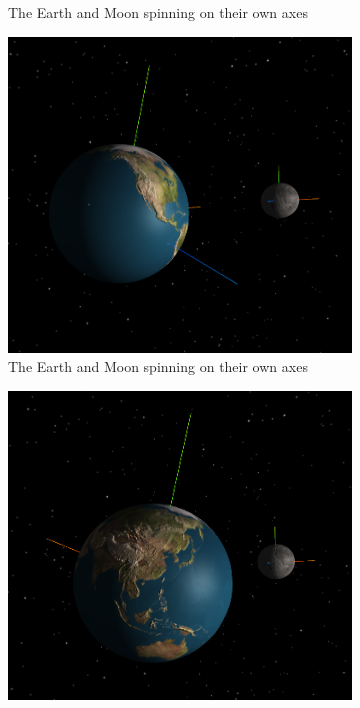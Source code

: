 \documentclass[12pt]{article}
\begin{document}
\begin{figure}[H]
\begin{subfigure}[b]{0.4\textwidth}
                \caption{The Earth and Moon spinning on their own axes}
                \label{fig: The axial spin of the Earth and moon.}
       \end{subfigure}
               \begin{subfigure}[b]{0.4\textwidth}
                \includegraphics[width=\textwidth]{images/earthandmoonaxisspin3}
                \caption{The Earth and Moon spinning on their own axes}
                \label{fig: The axial spin of the Earth and moon.}
       \end{subfigure}
               \begin{subfigure}[b]{0.4\textwidth}
                \includegraphics[width=\textwidth]{images/earthandmoonaxisspin4}

\end{subfigure}
\end{figure}
\end{document}
